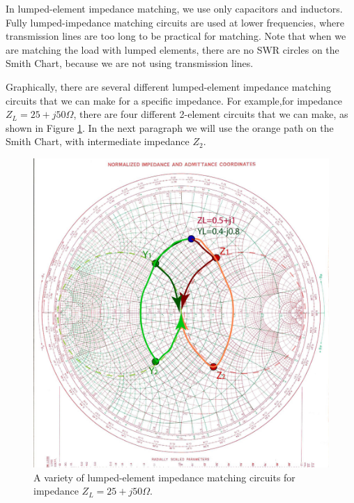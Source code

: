 \documentclass{ximera}
\begin{document}
In lumped-element impedance matching, we use only capacitors and inductors. Fully lumped-impedance matching circuits are used at lower frequencies, where transmission lines are too long to be practical for matching. Note that when we are matching the load with lumped elements, there are no SWR circles on the Smith Chart, because we are not using transmission lines.

Graphically, there are several different lumped-element impedance matching circuits that we can make for a specific impedance. For example,for impedance $Z_L=25+j50 \Omega$, there are four different 2-element circuits that we can make, as shown in Figure \ref{fig:LumpedVariety}. In the next paragraph we will use the orange path on the Smith Chart, with intermediate impedance $Z_2$.



\begin{figure}[htbp]
\begin{center}
\includegraphics[scale=0.4]{../jpg/LumpedVariety-01.jpg}
\end{center}
\caption{A variety of lumped-element impedance matching circuits for impedance $Z_L=25+j50 \Omega$.}
\label{fig:LumpedVariety}
\end{figure}
\end{document}
